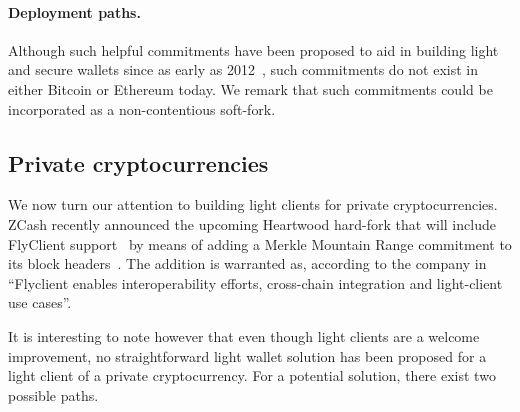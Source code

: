 \paragraph{Deployment paths.}
Although such helpful commitments have been proposed to aid in building light and secure wallets since as early as 2012~\cite{ultimate}, such commitments do not exist in either Bitcoin or Ethereum today. We remark that such commitments could be incorporated as a non-contentious soft-fork.

\subsection{Private cryptocurrencies}
We now turn our attention to building light clients for private cryptocurrencies. ZCash recently announced the upcoming Heartwood hard-fork that will include FlyClient support~\cite{zcash-heartwood-news} by means of adding a Merkle Mountain Range commitment to its block headers~\cite{zcash-flyclient-zip}. The addition is warranted as, according to the company in~\cite{zcash-heartwood-news} ``Flyclient enables interoperability efforts, cross-chain integration and light-client use cases''.

It is interesting to note however that even though light clients are a welcome improvement, no straightforward light wallet solution has been proposed for a light client of a private cryptocurrency. For a potential solution, there exist two possible paths.

